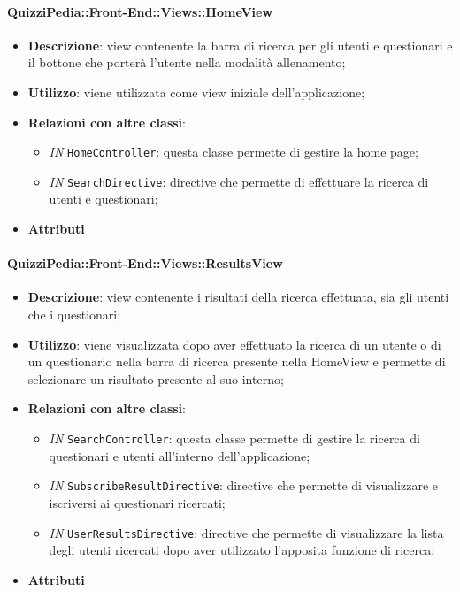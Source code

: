 \paragraph{QuizziPedia::Front-End::Views::HomeView}
\begin{itemize}
	\item \textbf{Descrizione}: view contenente la barra di ricerca per gli utenti e questionari e il bottone che porterà l'utente nella modalità allenamento;
	\item \textbf{Utilizzo}: viene utilizzata come view iniziale dell'applicazione;
	\item \textbf{Relazioni con altre classi}:
	\begin{itemize}
		\item \textit{IN} \texttt{HomeController}: questa classe permette di gestire la home page;
		\item \textit{IN} \texttt{SearchDirective}: directive che permette di effettuare la ricerca di utenti e questionari;
	\end{itemize}
	\item \textbf{Attributi}
\end{itemize}
	
\paragraph{QuizziPedia::Front-End::Views::ResultsView}
\begin{itemize}
	\item \textbf{Descrizione}: view contenente i risultati della ricerca effettuata, sia gli utenti che i questionari;
	\item \textbf{Utilizzo}: viene visualizzata dopo aver effettuato la ricerca di un utente o di un questionario nella barra di ricerca presente nella HomeView e permette di selezionare un risultato presente al suo interno; 
	\item \textbf{Relazioni con altre classi}:
	\begin{itemize}
		\item \textit{IN} \texttt{SearchController}: questa classe permette di gestire la ricerca di questionari e utenti all'interno dell'applicazione;
		\item \textit{IN} \texttt{SubscribeResultDirective}: directive che permette di visualizzare e iscriversi ai questionari ricercati;
		\item \textit{IN} \texttt{UserResultsDirective}: directive che permette di visualizzare la lista degli utenti ricercati dopo aver utilizzato l'apposita funzione di ricerca;
	\end{itemize}
	\item \textbf{Attributi}
\end{itemize}

